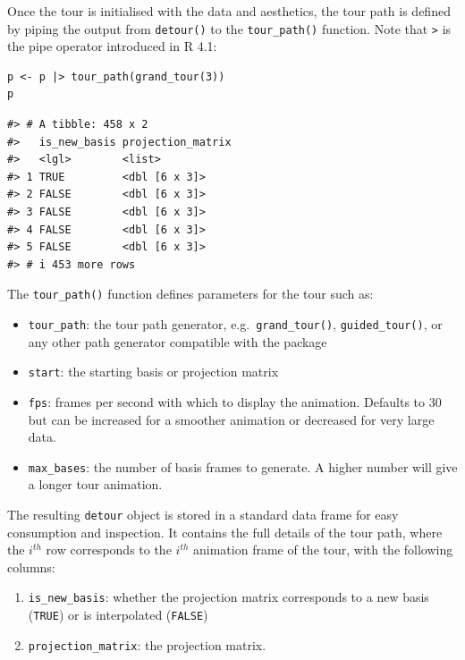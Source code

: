 Once the tour is initialised with the data and aesthetics, the tour path is defined by piping the output from \texttt{detour()} to the \texttt{tour\_path()} function. Note that \texttt{\textbar{}\textgreater{}} is the pipe operator introduced in R 4.1:

\pagebreak

\begin{verbatim}
p <- p |> tour_path(grand_tour(3))
p
\end{verbatim}

\begin{verbatim}
#> # A tibble: 458 x 2
#>   is_new_basis projection_matrix
#>   <lgl>        <list>           
#> 1 TRUE         <dbl [6 x 3]>    
#> 2 FALSE        <dbl [6 x 3]>    
#> 3 FALSE        <dbl [6 x 3]>    
#> 4 FALSE        <dbl [6 x 3]>    
#> 5 FALSE        <dbl [6 x 3]>    
#> # i 453 more rows
\end{verbatim}

The \texttt{tour\_path()} function defines parameters for the tour such as:

\begin{itemize}
\tightlist
\item
  \texttt{tour\_path}: the tour path generator, e.g.~\texttt{grand\_tour()}, \texttt{guided\_tour()}, or any other path generator compatible with the  package
\item
  \texttt{start}: the starting basis or projection matrix
\item
  \texttt{fps}: frames per second with which to display the animation. Defaults to 30 but can be increased for a smoother animation or decreased for very large data.
\item
  \texttt{max\_bases}: the number of basis frames to generate. A higher number will give a longer tour animation.
\end{itemize}

The resulting \texttt{detour} object is stored in a standard data frame for easy consumption and inspection. It contains the full details of the tour path, where the \(i^{th}\) row corresponds to the \(i^{th}\) animation frame of the tour, with the following columns:

\begin{enumerate}
\def\labelenumi{\arabic{enumi}.}
\tightlist
\item
  \texttt{is\_new\_basis}: whether the projection matrix corresponds to a new basis (\texttt{TRUE}) or is interpolated (\texttt{FALSE})
\item
  \texttt{projection\_matrix}: the projection matrix.
\end{enumerate}

